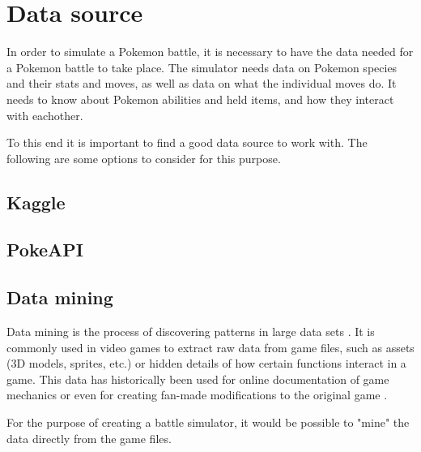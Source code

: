 \section{Data source}
\label{sec:data-source}

In order to simulate a Pokemon battle, it is necessary to have the data needed for a Pokemon battle to take place.
The simulator needs data on Pokemon species and their stats and moves, as well as data on what the individual moves do.
It needs to know about Pokemon abilities and held items, and how they interact with eachother.

To this end it is important to find a good data source to work with. The following are some options to consider
for this purpose.

\subsection{Kaggle}
\subsection{PokeAPI}
\subsection{Data mining}
Data mining is the process of discovering patterns in large data sets \cite{DataMining}. It is commonly used in video games to extract raw data 
from game files, such as assets (3D models, sprites, etc.) or hidden details of how certain functions interact in a game. This data has historically
been used for online documentation of game mechanics \cite{DataMiningPokemon} or even for creating fan-made modifications to the original game \cite{RenegadePlatinum}.

For the purpose of creating a battle simulator, it would be possible to "mine" the data directly from the game files.
